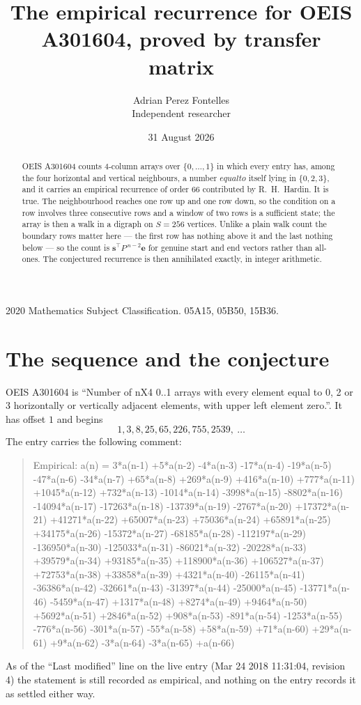 \documentclass[11pt,a4paper]{article}
\title{The empirical recurrence for OEIS A301604, proved by transfer matrix}
\author{Adrian Perez Fontelles\\ \small Independent researcher}
\date{31 August 2026}
\theoremstyle{plain}
\theoremstyle{definition}
\begin{document}
\maketitle

\begin{abstract}
OEIS A301604 counts $4$-column arrays over $\{0,\dots,1\}$ in which every entry has,
among the four horizontal and vertical neighbours, a number $equal to$ itself lying in $\{0,2,3\}$, and it carries an empirical
recurrence of order $66$ contributed by R.~H.~Hardin. It is true. The neighbourhood
reaches one row up and one row down, so the condition on a row involves three consecutive
rows and a window of two rows is a sufficient state; the array is then a walk in a digraph
on $S=256$ vertices. Unlike a plain walk count the boundary rows matter here --- the first
row has nothing above it and the last nothing below --- so the count is
$\mathbf{s}^{\!\top}P^{\,n-2}\mathbf{e}$ for genuine start and end vectors rather than
all-ones. The conjectured recurrence is then annihilated exactly, in integer arithmetic.
\end{abstract}

\noindent\small 2020 Mathematics Subject Classification. 05A15, 05B50, 15B36.\normalsize

\section{The sequence and the conjecture}

OEIS A301604 is ``Number of nX4 0..1 arrays with every element equal to 0, 2 or 3 horizontally or vertically adjacent elements, with upper left element zero.''. It has offset
$1$ and begins
\[
1, 3, 8, 25, 65, 226, 755, 2539,\ \dots
\]
The entry carries the following comment:
\begin{quote}\small
Empirical: a(n) = 3*a(n-1) +5*a(n-2) -4*a(n-3) -17*a(n-4) -19*a(n-5) -47*a(n-6) -34*a(n-7) +65*a(n-8) +269*a(n-9) +416*a(n-10) +777*a(n-11) +1045*a(n-12) +732*a(n-13) -1014*a(n-14) -3998*a(n-15) -8802*a(n-16) -14094*a(n-17) -17263*a(n-18) -13739*a(n-19) -2767*a(n-20) +17372*a(n-21) +41271*a(n-22) +65007*a(n-23) +75036*a(n-24) +65891*a(n-25) +34175*a(n-26) -15372*a(n-27) -68185*a(n-28) -112197*a(n-29) -136950*a(n-30) -125033*a(n-31) -86021*a(n-32) -20228*a(n-33) +39579*a(n-34) +93185*a(n-35) +118900*a(n-36) +106527*a(n-37) +72753*a(n-38) +33858*a(n-39) +4321*a(n-40) -26115*a(n-41) -36386*a(n-42) -32661*a(n-43) -31397*a(n-44) -25000*a(n-45) -13771*a(n-46) -5459*a(n-47) +1317*a(n-48) +8274*a(n-49) +9464*a(n-50) +5692*a(n-51) +2846*a(n-52) +908*a(n-53) -891*a(n-54) -1253*a(n-55) -776*a(n-56) -301*a(n-57) -55*a(n-58) +58*a(n-59) +71*a(n-60) +29*a(n-61) +9*a(n-62) -3*a(n-64) -3*a(n-65) +a(n-66)
\end{quote}
As of the ``Last modified'' line on the live entry (Mar 24 2018 11:31:04, revision
4) the statement is still recorded as empirical, and nothing on the entry
records it as settled either way.
\end{document}
